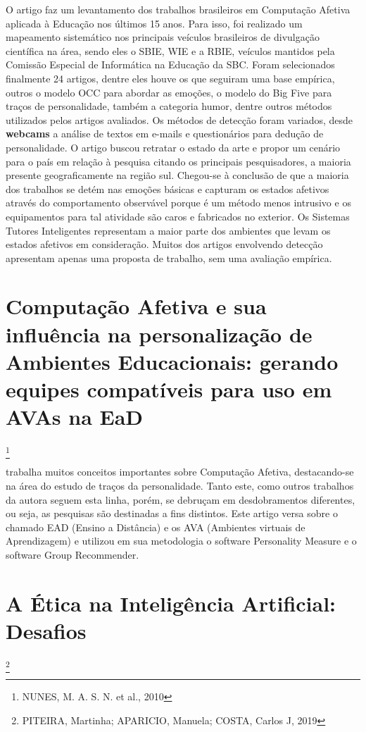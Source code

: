 \documentclass[
	12pt,				    %
	openright,			    %
	oneside,			    %
	a4paper,			    %
    sumario=tradicional,    %
	english,			    %
	brazil,				    %
	]{abntex2}              %
\begin{document}
 O artigo faz um levantamento dos trabalhos brasileiros em Computação Afetiva aplicada à Educação nos últimos 15 anos. Para isso, foi realizado um mapeamento sistemático nos principais veículos brasileiros de divulgação científica na área, sendo eles o SBIE, WIE e a RBIE, veículos mantidos pela Comissão Especial de Informática na Educação da SBC. Foram selecionados finalmente 24 artigos, dentre eles houve os que seguiram uma base empírica, outros o modelo OCC para abordar as emoções, o modelo do Big Five para traços de personalidade, também a categoria humor, dentre outros métodos utilizados pelos artigos avaliados. Os métodos de detecção foram variados, desde \textbf{webcams} a análise de textos em e-mails e questionários para dedução de personalidade. O artigo buscou retratar o estado da arte e propor um cenário para o país em relação à pesquisa citando os principais pesquisadores, a maioria presente geograficamente na região sul. Chegou-se à conclusão de que a maioria dos trabalhos se detém nas emoções básicas e capturam os estados afetivos através do comportamento observável porque é um método menos intrusivo e os equipamentos para tal atividade são caros e fabricados no exterior. Os Sistemas Tutores Inteligentes representam a maior parte dos ambientes que levam os estados afetivos em consideração. Muitos dos artigos envolvendo detecção apresentam apenas uma proposta de trabalho, sem uma avaliação empírica.

\section{Computação Afetiva e sua influência na personalização de Ambientes Educacionais: gerando equipes compatíveis para uso em AVAs na EaD}\footnote{NUNES, M. A. S. N. et al., 2010}

 trabalha muitos conceitos importantes sobre Computação Afetiva, destacando-se na área do estudo de traços da personalidade. Tanto este, como outros trabalhos da autora seguem esta linha, porém, se debruçam em desdobramentos diferentes, ou seja, as pesquisas são destinadas a fins distintos. Este artigo versa sobre o chamado EAD (Ensino a Distância) e os AVA (Ambientes virtuais de Aprendizagem) e utilizou em sua metodologia o software Personality Measure e o software Group Recommender.


\section{A Ética na Inteligência Artificial: Desafios} \footnote{PITEIRA, Martinha; APARICIO, Manuela; COSTA, Carlos J, 2019}
\end{document}

